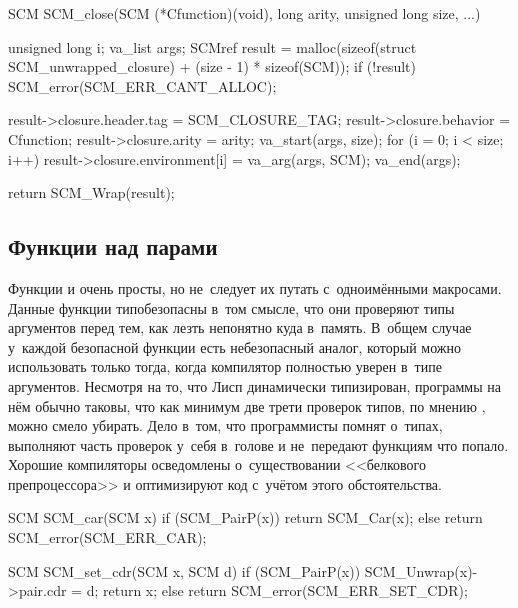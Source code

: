 \begin{code:c}
SCM SCM_close(SCM (*Cfunction)(void), long arity,
              unsigned long size, ...)
{
    unsigned long i;
    va_list args;
    SCMref result = malloc(sizeof(struct SCM_unwrapped_closure)
                           + (size - 1) * sizeof(SCM));
    if (!result)
    {
        SCM_error(SCM_ERR_CANT_ALLOC);
    }

    result->closure.header.tag = SCM_CLOSURE_TAG;
    result->closure.behavior   = Cfunction;
    result->closure.arity      = arity;
    va_start(args, size);
    for (i = 0; i < size; i++) {
        result->closure.environment[i] = va_arg(args, SCM);
    }
    va_end(args);

    return SCM_Wrap(result);
}
\end{code:c}


\subsection{Функции над парами}\label{cc/runtime/ssect:pairs}

Функции  и  очень просты, но не~следует их путать
с~одноимёнными макросами. Данные функции типобезопасны в~том смысле, что они
проверяют типы аргументов перед тем, как лезть непонятно куда в~память. В~общем
случае у~каждой безопасной функции есть небезопасный аналог, который можно
использовать только тогда, когда компилятор полностью уверен в~типе аргументов.
Несмотря на то, что Лисп динамически типизирован, программы на нём обычно
таковы, что как минимум две трети проверок типов, по мнению
\cite{hen92a,wc94,ser94}, можно смело убирать. Дело в~том, что программисты
помнят о~типах, выполняют часть проверок у~себя в~голове и не~передают функциям
что попало. Хорошие компиляторы осведомлены о~существовании <<белкового
препроцессора>> и оптимизируют код с~учётом этого обстоятельства.

\begin{code:c}
SCM SCM_car(SCM x)
{
    if (SCM_PairP(x)) {
        return SCM_Car(x);
    }
    else return SCM_error(SCM_ERR_CAR);
}

SCM SCM_set_cdr(SCM x, SCM d)
{
    if (SCM_PairP(x)) {
        SCM_Unwrap(x)->pair.cdr = d;
        return x;
    }
    else return SCM_error(SCM_ERR_SET_CDR);
}
\end{code:c}

